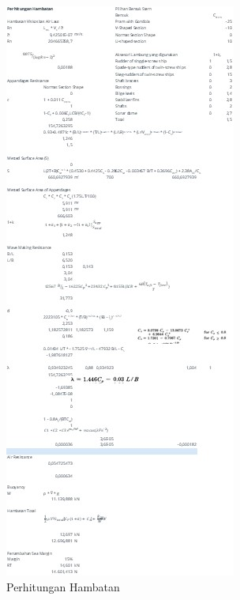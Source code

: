 \begin{figure}[!ht]
    \centering
    \includegraphics[width=\linewidth,height=\textheight,keepaspectratio]{lampiran/deskap-2.jpg}
    \caption*{Perhitungan Hambatan}
\end{figure}

